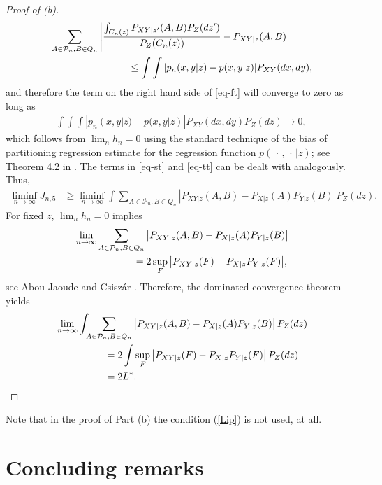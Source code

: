 \documentclass[11pt]{article}
\def\Q{Q}
\def\P{\mathcal{P}}
\begin{document}
\begin{proof}[Proof of (b)]
\begin{align*}
\MoveEqLeft[8] \sum_{A\in \P_n,B\in \Q_n}
\left|\frac{\int_{C_n(z)}P_{XY|z'}(A,B)P_Z(dz')}{P_Z(C_n(z))}
-
P_{XY|z}(A,B)\right|\\
&\le
\int\int |p_n(x,y|z)-p(x,y|z)|P_{XY}(dx,dy),
\end{align*}
and therefore the  term on  the right hand side of \eqref{eq-ft}  will converge to zero as long as   
\begin{align*}
\int\int\int |p_n(x,y|z)-p(x,y| z)|P_{XY}(dx,dy)P_Z(dz)\to 0,
\end{align*}
which follows from $\lim_n h_n=0$ using the standard technique of the bias of partitioning regression estimate for the regression function $p(\, \cdot \, ,\, \cdot \, | z)$;  see Theorem 4.2 in  \cite{GyKoKrWa02}.
The terms in \eqref{eq-st}  and \eqref{eq-tt} can be dealt with analogously.
Thus,
\begin{align*}
\liminf_{n\to\infty} J_{n,5}
&\ge
\liminf_{n\to\infty}
\int
\sum_{A\in \P_n,B\in \Q_n}\left|P_{XY|z}(A,B)
-P_{X|z}(A)P_{Y|z}(B)
\right| P_Z(dz) .
\end{align*}
For fixed $z$, $\lim_n h_n=0$   implies 
\begin{align*}
\MoveEqLeft[6] \lim_{n\to\infty}
\sum_{A\in \P_n,B\in \Q_n}\left|P_{XY|z} (A,B)
-P_{X|z}(A)P_{Y|z}(B) \right|\\
&=
2 \sup_F \big| P_{XY|z} (F)-P_{X|z}P_{Y|z} (F)\big|,
\end{align*}
see Abou-Jaoude \cite{Abo76} and  Csisz\'ar \cite{Csi73}.
Therefore, the dominated convergence theorem yields
\begin{align*}
\MoveEqLeft[5]
\lim_{n\to\infty}
\int \!\!\!
\sum_{A\in \P_n,B\in \Q_n}\left|P_{XY|z} (A,B)
-P_{X|z}(A)P_{Y|z}(B) \right|P_Z(dz)\\
&=
2\int \sup_F \big| P_{XY|z} (F)-P_{X|z} P_{Y|z} (F)\big| \, P_Z(dz) \\
&=
2L^*.
\end{align*}

\end{proof} 

Note that  in the proof of Part (b) the condition (\ref{Lip}) is not used, at all.


\section{Concluding remarks}

\label{sec-concl}
\end{document}
